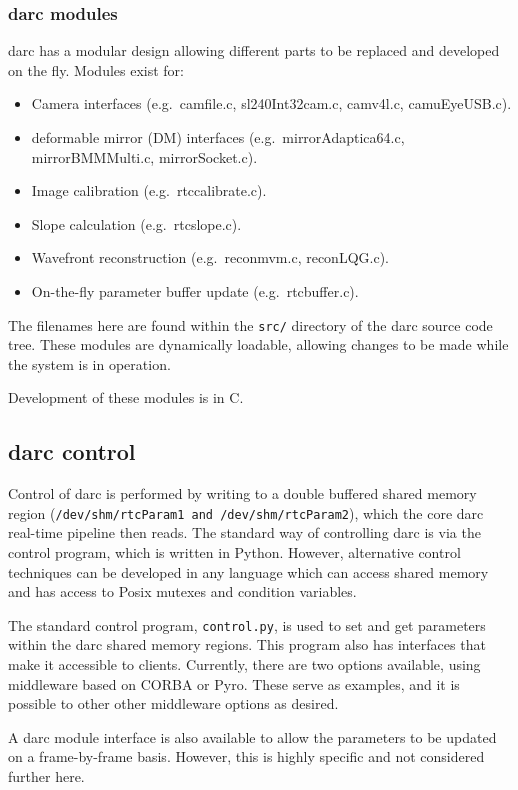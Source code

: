 \documentclass[a4,10pt]{article}
\newcommand{\dm}{deformable mirror (DM)\renewcommand{\dm}{DM\xspace}\xspace}
\begin{document}
\subsubsection{darc modules}
darc has a modular design allowing different parts to be replaced and
developed on the fly.  Modules exist for:
\begin{itemize}
\item Camera interfaces (e.g.\ camfile.c, sl240Int32cam.c, camv4l.c,
  camuEyeUSB.c).
\item \dm interfaces (e.g.\ mirrorAdaptica64.c, mirrorBMMMulti.c,
  mirrorSocket.c).
\item Image calibration (e.g.\ rtccalibrate.c).
\item Slope calculation (e.g.\ rtcslope.c).
\item Wavefront reconstruction (e.g.\ reconmvm.c, reconLQG.c).
\item On-the-fly parameter buffer update (e.g.\ rtcbuffer.c).
\end{itemize}
The filenames here are found within the {\tt src/} directory of the
darc source code tree.  These modules are dynamically loadable,
allowing changes to be made while the system is in operation.

Development of these modules is in C.

\subsection{darc control}
Control of darc is performed by writing to a double buffered shared
memory region ({\tt /dev/shm/rtcParam1 and /dev/shm/rtcParam2}), which
the core darc real-time pipeline then reads.  The standard way of
controlling darc is via the control program, which is written in
Python.  However, alternative control techniques can be developed in
any language which can access shared memory and has access to Posix
mutexes and condition variables.

The standard control program, {\tt control.py}, is used to set and get
parameters within the darc shared memory regions.  This program also
has interfaces that make it accessible to clients.  Currently, there
are two options available, using middleware based on CORBA or Pyro.
These serve as examples, and it is possible to other other middleware
options as desired.

A darc module interface is also available to allow the parameters to
be updated on a frame-by-frame basis.  However, this is highly
specific and not considered further here.
\end{document}

